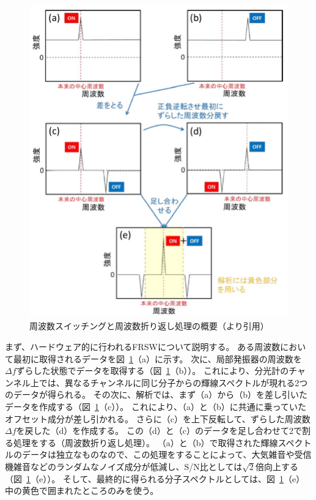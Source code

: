 \begin{figure}[htbp]
    \centering
    \includegraphics[width=\linewidth]{master_thesis_contents/master_thesis_fig/frsw_process.pdf}
    \caption{周波数スイッチングと周波数折り返し処理の概要（\cite{ito2017master}より引用）}
    \label{fig:frsw_process}
\end{figure}
まず、ハードウェア的に行われるFRSWについて説明する。
ある周波数において最初に取得されるデータを図~\ref{fig:frsw_process}（a）に示す。
次に、局部発振器の周波数を$\varDelta f$ずらした状態でデータを取得する（図~\ref{fig:frsw_process}（b））。
これにより、分光計のチャンネル上では、異なるチャンネルに同じ分子からの輝線スペクトルが現れる2つのデータが得られる。
その次に、解析では、まず（a）から（b）を差し引いたデータを作成する（図~\ref{fig:frsw_process}（c））。
これにより、（a）と（b）に共通に乗っていたオフセット成分が差し引かれる。
さらに（c）を上下反転して、ずらした周波数$\varDelta f$を戻した（d）を作成する。
この（d）と（c）のデータを足し合わせて2で割る処理をする（周波数折り返し処理）。
（a）と（b）で取得された輝線スペクトルのデータは独立なものなので、この処理をすることによって、大気雑音や受信機雑音などのランダムなノイズ成分が低減し、S/N比としては$\sqrt{2}$倍向上する（図~\ref{fig:frsw_process}（e））。
そして、最終的に得られる分子スペクトルとしては、図~\ref{fig:frsw_process}（e）中の黄色で囲まれたところのみを使う。
\clearpage


